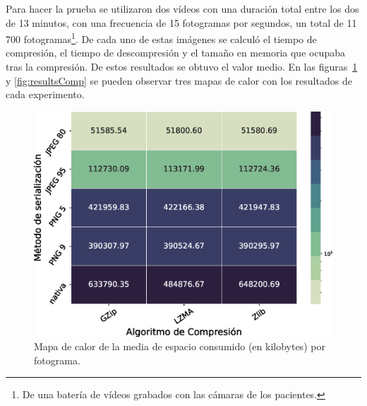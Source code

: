 Para hacer la prueba se utilizaron dos vídeos con una duración total entre los dos de 13 minutos, con una frecuencia de 15 fotogramas por segundos, un total de 11\,700 fotogramas\footnote{De una batería de vídeos grabados con las cámaras de los pacientes.}. De cada uno de estas imágenes se calculó el tiempo de compresión, el tiempo de descompresión y el tamaño en memoria que ocupaba tras la compresión. De estos resultados se obtuvo el valor medio. En las figuras~\ref{fig:heatmapmemory} y \ref{fig:resultsComp} se pueden observar tres mapas de calor con los resultados de cada experimento.

\begin{figure}[h]
	\centering
	\includegraphics[width=\textwidth]{img/MemoriaMediaLog.eps}
	\caption{Mapa de calor de la media de espacio consumido (en kilobytes) por fotograma.}
	\label{fig:heatmapmemory}
\end{figure}

